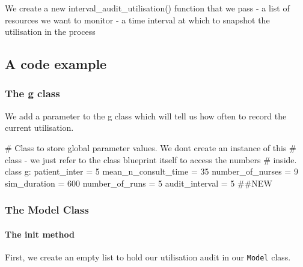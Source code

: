 \documentclass[
  letterpaper,
  DIV=11,
  numbers=noendperiod]{scrreprt}
\let\oldparagraph\paragraph
\renewcommand{\paragraph}[1]{\oldparagraph{#1}\mbox{}}
\newenvironment{Shaded}{\begin{snugshade}}{\end{snugshade}}
\newcommand{\CommentTok}[1]{\textcolor[rgb]{0.37,0.37,0.37}{#1}}
\newcommand{\DecValTok}[1]{\textcolor[rgb]{0.68,0.00,0.00}{#1}}
\newcommand{\KeywordTok}[1]{\textcolor[rgb]{0.00,0.23,0.31}{#1}}
\newcommand{\NormalTok}[1]{\textcolor[rgb]{0.00,0.23,0.31}{#1}}
\newcommand{\OperatorTok}[1]{\textcolor[rgb]{0.37,0.37,0.37}{#1}}
\begin{document}
We create a new interval\_audit\_utilisation() function that we pass - a
list of resources we want to monitor - a time interval at which to
snapshot the utilisation in the process

\subsection{A code example}\label{a-code-example-1}

\subsubsection{The g class}\label{the-g-class-7}

We add a parameter to the g class which will tell us how often to record
the current utilisation.

\begin{Shaded}
\begin{Highlighting}[]
\CommentTok{\# Class to store global parameter values.  We don\textquotesingle{}t create an instance of this}
\CommentTok{\# class {-} we just refer to the class blueprint itself to access the numbers}
\CommentTok{\# inside.}
\KeywordTok{class}\NormalTok{ g:}
\NormalTok{    patient\_inter }\OperatorTok{=} \DecValTok{5}
\NormalTok{    mean\_n\_consult\_time }\OperatorTok{=} \DecValTok{35}
\NormalTok{    number\_of\_nurses }\OperatorTok{=} \DecValTok{9}
\NormalTok{    sim\_duration }\OperatorTok{=} \DecValTok{600}
\NormalTok{    number\_of\_runs }\OperatorTok{=} \DecValTok{5}
\NormalTok{    audit\_interval }\OperatorTok{=} \DecValTok{5} \CommentTok{\#\#NEW}
\end{Highlighting}
\end{Shaded}

\subsubsection{The Model Class}\label{the-model-class-7}

\paragraph{\texorpdfstring{The \textbf{init}
method}{The init method}}\label{the-init-method-8}

First, we create an empty list to hold our utilisation audit in our
\texttt{Model} class.
\end{document}
